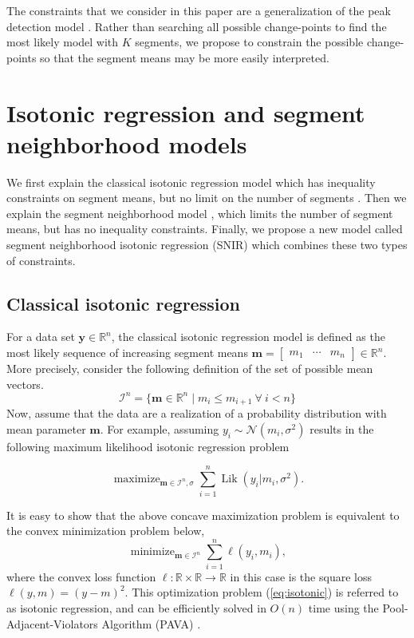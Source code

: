 \documentclass{article}
\DeclareMathOperator*{\Lik}{Lik}
\DeclareMathOperator*{\maximize}{maximize}
\DeclareMathOperator*{\minimize}{minimize}
\newcommand{\RR}{\mathbb R}
\begin{document}
The constraints that we consider in this paper are a generalization of
the peak detection model \citep{HOCKING-PeakSeg}. Rather than
searching all possible change-points to find the most likely model
with $K$ segments, we propose to constrain the possible change-points
so that the segment means may be more easily interpreted.

\section{Isotonic regression and segment neighborhood models}

We first explain the classical isotonic regression model which has
inequality constraints on segment means, but no limit on the number of
segments \citep{mair2009isotone}. Then we explain the segment
neighborhood model \citep{segment-neighborhood}, which limits the
number of segment means, but has no inequality constraints. Finally,
we propose a new model called segment neighborhood isotonic regression
(SNIR) which combines these two types of constraints.

\subsection{Classical isotonic regression}

For a data set $\mathbf y\in\RR^n$, the classical isotonic regression
model is defined as the most likely sequence of increasing segment
means $\mathbf m = \left[
\begin{array}{ccc}
  m_1& \cdots &m_n
\end{array}
\right]
\in\RR^n$. More precisely, consider the following definition
of the set of possible mean vectors.
\begin{equation}
  \mathcal I^n = \{\mathbf m\in\RR^n \mid m_i \leq m_{i+1} \ \forall\ i<n\}
\end{equation}
Now, assume that the data are a realization of a probability
distribution with mean parameter $\mathbf m$. For example, assuming
$y_i \sim \mathcal N(m_i, \sigma^2)$ results in the following maximum
likelihood isotonic regression problem

\begin{equation}
  \label{eq:max_lik}
  \maximize_{\mathbf m\in\mathcal I^n, \sigma} \sum_{i=1}^n \Lik(y_i| m_i, \sigma^2).
\end{equation}

It is easy to show that the above concave maximization problem is equivalent
to the convex minimization problem below,
\begin{equation}
  \label{eq:isotonic}
  \minimize_{\mathbf m\in\mathcal I^n} \sum_{i=1}^n \ell(y_i, m_i),
\end{equation}
where the convex loss function $\ell:\RR\times \RR\rightarrow\RR$ in
this case is the square loss $\ell(y, m) = (y-m)^2$. This optimization
problem (\ref{eq:isotonic}) is referred to as isotonic regression, and
can be efficiently solved in $O(n)$ time using the
Pool-Adjacent-Violators Algorithm (PAVA) \citep{isotonic-unifying}.
\end{document}

